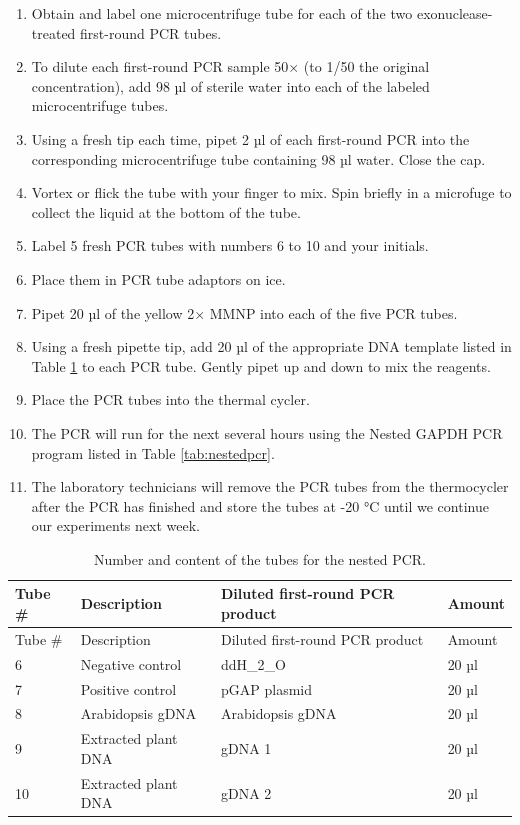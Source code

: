 \documentclass[]{book}
\providecommand{\tightlist}{%
  \setlength{\itemsep}{0pt}\setlength{\parskip}{0pt}}
\begin{document}
\begin{enumerate}
\def\labelenumi{\arabic{enumi}.}
\tightlist
\item
  Obtain and label one microcentrifuge tube for each of the two exonuclease-treated first-round PCR tubes.
\item
  To dilute each first-round PCR sample 50× (to 1/50 the original concentration), add 98 µl of sterile water into each of the labeled microcentrifuge tubes.
\item
  Using a fresh tip each time, pipet 2 µl of each first-round PCR into the corresponding microcentrifuge tube containing 98 µl water. Close the cap.
\item
  Vortex or flick the tube with your finger to mix. Spin briefly in a microfuge to collect the liquid at the bottom of the tube.
\item
  Label 5 fresh PCR tubes with numbers 6 to 10 and your initials.
\item
  Place them in PCR tube adaptors on ice.
\item
  Pipet 20 µl of the yellow 2× MMNP into each of the five PCR tubes.
\item
  Using a fresh pipette tip, add 20 µl of the appropriate DNA template listed in Table \ref{tab:nestedtubes} to each PCR tube. Gently pipet up and down to mix the reagents.
\item
  Place the PCR tubes into the thermal cycler.
\item
  The PCR will run for the next several hours using the Nested GAPDH PCR program listed in Table \ref{tab:nestedpcr}.
\item
  The laboratory technicians will remove the PCR tubes from the thermocycler after the PCR has finished and store the tubes at -20 °C until we continue our experiments next week.
\end{enumerate}

\begin{longtable}[]{@{}llll@{}}
\caption{\label{tab:nestedtubes} Number and content of the tubes for the nested PCR.}\tabularnewline
\toprule
Tube \# & Description & Diluted first-round PCR product & Amount\tabularnewline
\midrule
\endfirsthead
\toprule
Tube \# & Description & Diluted first-round PCR product & Amount\tabularnewline
\midrule
\endhead
6 & Negative control & ddH\_2\_O & 20 µl\tabularnewline
7 & Positive control & pGAP plasmid & 20 µl\tabularnewline
8 & Arabidopsis gDNA & Arabidopsis gDNA & 20 µl\tabularnewline
9 & Extracted plant DNA & gDNA 1 & 20 µl\tabularnewline
10 & Extracted plant DNA & gDNA 2 & 20 µl\tabularnewline
\bottomrule
\end{longtable}
\end{document}
